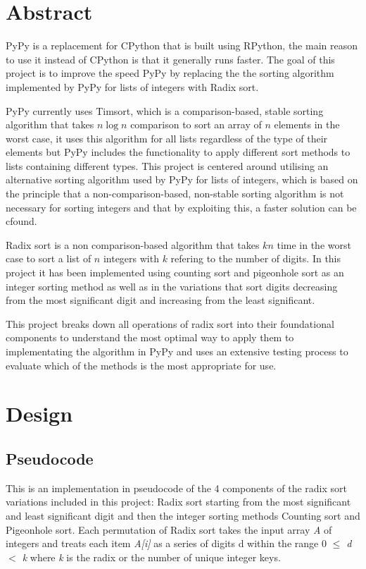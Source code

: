 \documentclass[12pt]{article}
\begin{document}
\section{Abstract}
\renewcommand{\lstlistingname}{Snippet}
PyPy is a replacement for CPython that is built using RPython, the main reason to use it instead of CPython is that it generally runs faster. The goal of this project is to improve the speed PyPy by replacing the the sorting algorithm implemented by PyPy for lists of integers with Radix sort.
\par
PyPy currently uses Timsort, which is a comparison-based, stable sorting algorithm that takes $n\log{n}$ comparison to sort an array of $n$ elements in the worst case, it uses this algorithm for all lists regardless of the type of their elements but PyPy includes the functionality to apply different sort methods to lists containing different types. This project is centered around utilising an alternative sorting algorithm used by PyPy for lists of integers, which is based on the principle that a non-comparison-based, non-stable sorting algorithm is not necessary for sorting integers and that by exploiting this, a faster solution can be cfound. 
\par
Radix sort is a non comparison-based algorithm that takes $kn$ time in the worst case to sort a list of $n$ integers with $k$ refering to the number of digits. In this project it has been implemented using counting sort and pigeonhole sort as an integer sorting method as well as in the variations that sort digits decreasing from the most significant digit and increasing from the least significant.
\par
This project breaks down all operations of radix sort into their foundational components to understand the most optimal way to apply them to implementating the algorithm in PyPy and uses an extensive testing process to evaluate which of the methods is the most appropriate for use.
\pagebreak

\section{Design}
\label{sec:design}
	\subsection{Pseudocode}
	This is an implementation in pseudocode of the 4 components of the radix sort variations included in this project: Radix sort starting from the most significant and least significant digit and then the integer sorting methods Counting sort and Pigeonhole sort. Each permutation of Radix sort takes the input array \textit{A} of integers and treats each item \textit{A[i]} as a series of digits d within the range 0 \textit{$\leq$ d $<$ k} where \textit{k} is the radix or the number of unique integer keys. 
\end{document}
